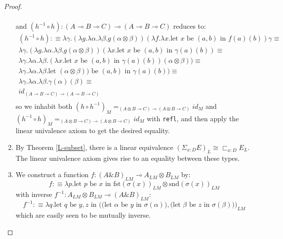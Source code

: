 \begin{thm}
\begin{proof}
\begin{enumerate}
\[\begin{split}
          \end{split}          
        \]
        and $(h^{-1} \circ h) : (A \multimap B \multimap C) \multimap (A \multimap B \multimap C)$ reduces to:
      \[
        \begin{split}
          (h^{-1} \circ h) : \equiv \lambda \gamma. ( \lambda g. \lambda \alpha. \lambda \beta. g(\alpha \otimes \beta))(\lambda f. \lambda x . \text{let $x$ be $(a, b)$ in $f(a)(b)$}) \gamma \equiv\\
          \lambda \gamma. ( \lambda g. \lambda \alpha. \lambda \beta. g(\alpha \otimes \beta))(\lambda x . \text{let $x$ be $(a, b)$ in $\gamma(a)(b)$}) \equiv\\
          \lambda \gamma. \lambda \alpha. \lambda \beta. (\lambda x . \text{let $x$ be $(a, b)$ in $\gamma(a)(b)$})(\alpha \otimes \beta)) \equiv\\
          \lambda \gamma. \lambda \alpha. \lambda \beta. \text{let $(\alpha \otimes \beta))$ be $(a, b)$ in $\gamma(a)(b)$}) \equiv\\
          \lambda \gamma. \lambda \alpha. \lambda \beta. \gamma(\alpha)(\beta) \equiv\\
    id_{(A \multimap B \multimap C) \multimap (A \multimap B \multimap C)}\\
        \end{split}
      \]
      so we inhabit both $(h \circ h^{-1})_M =_{(A \otimes B \multimap C) \multimap (A \otimes B \multimap C)} id_M$ and $(h^{-1} \circ h)_M =_{(A \otimes B \multimap C) \multimap (A \otimes B \multimap C)} id_M$ with \texttt{refl}, and then apply the linear univalence axiom to get the desired equality.
    \item By Theorem \ref{L-subset}, there is a linear equivalence $(\Sigma_{x :D}E)_L \cong \sqsubset_{x :D}E_L$. The linear univalence axiom gives rise to an equality between these types.
    \item We construct a function $f : (A \& B)_{LM} \multimap A_{LM} \otimes B_{LM}$ by:
      \[
        f :\equiv \lambda p. \text{let $p$ be $x$ in $\text{fst}(\sigma(x))_{LM} \otimes \text{snd}(\sigma(x))_{LM}$}
      \]
      with inverse $f^{-1} : A_{LM} \otimes B_{LM} \multimap  (A \& B)_{LM}$:
      \[
        f^{-1} :\equiv \lambda q. \text{let $q$ be $y, z$ in $\Big (\big ($let $\alpha$ be $y$ in $\sigma(\alpha) \big ), \big ($let $\beta$ be $z$ in $\sigma(\beta) \big) \Big )_{LM}$}
      \]
      which are easily seen to be mutually inverse.
      \end{enumerate}
    \end{proof}
  \end{thm}
